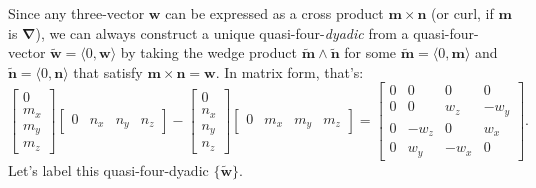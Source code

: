 \documentclass[12pt]{article}
\renewcommand{\vv}[1]{\mathbf{#1}}
\newcommand{\del}{\boldsymbol{\nabla}}
\begin{document}
Since any three-vector $\vv w$ can be expressed as a cross product ${ \vv m \times \vv n }$ (or curl, if $\vv m$ is $\del$), we can always construct a unique quasi-four-\emph{dyadic} from a quasi-four-vector $\tilde{\vv w} = \langle 0, \vv w \rangle$ by taking the wedge product $\tilde{\vv m} \wedge \tilde{\vv n}$ for some $\tilde{\vv m} = \langle 0, \vv m \rangle$ and $\tilde{\vv n} = \langle 0, \vv n \rangle$ that satisfy ${ \vv m \times \vv n = \vv w }$. In matrix form, that's:
\begin{equation*}
\begin{bmatrix}
0 \\
m_x \\
m_y \\
m_z
\end{bmatrix}
\begin{bmatrix}
0 & n_x & n_y & n_z
\end{bmatrix}
-
\begin{bmatrix}
0 \\
n_x \\
n_y \\
n_z
\end{bmatrix}
\begin{bmatrix}
0 & m_x & m_y & m_z
\end{bmatrix}
=
\begin{bmatrix}
0 & 0 & 0 & 0 \\
0 & 0 & w_z & -w_y \\
0 & -w_z & 0 & w_x \\
0 & w_y & -w_x & 0
\end{bmatrix} .
\end{equation*}
Let's label this quasi-four-dyadic $\{ \tilde{\vv w} \}$.
\end{document}
